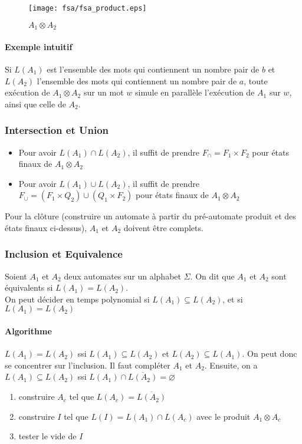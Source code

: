 \documentclass[a4paper]{article}
\begin{document}
  \begin{figure}[H]
    \begin{center}
      \texttt{[image: fsa/fsa\_product.eps]}
      \caption{$A_1 \otimes A_2$}
    \end{center}
  \end{figure}

  \paragraph{Exemple intuitif} Si $L(A_1)$ est l'ensemble des mots qui contiennent
  un nombre pair de $b$ et $L(A_2)$ l'ensemble des mots qui contiennent un 
  nombre pair de $a$, toute exécution de $A_1 \otimes A_2$ sur un mot $w$ simule
  en parallèle l'exécution de $A_1$ sur $w$, ainsi que celle de $A_2$.

  \subsubsection{Intersection et Union}
  \begin{itemize}
    \item Pour avoir $L(A_1) \cap L(A_2)$, il suffit de prendre $F_\cap = F_1 \times F_2$
    pour états finaux de $A_1 \otimes A_2$
    \item Pour avoir $L(A_1) \cup L(A_2)$, il suffit de prendre $F_\cup = (F_1 \times Q_2) \cup (Q_1 \times F_2)$
    pour états finaux de $A_1 \otimes A_2$
  \end{itemize}
  Pour la clôture (construire un automate à partir du pré-automate produit et des états
  finaux ci-dessus), $A_1$ et $A_2$ doivent être complets.

  \subsubsection{Inclusion et Equivalence}
  Soient $A_1$ et $A_2$ deux automates sur un alphabet $\Sigma$. On dit que
  $A_1$ et $A_2$ sont équivalents si $L(A_1) = L(A_2)$.\\
  On peut décider en temps polynomial si $L(A_1) \subseteq L(A_2)$, et si $L(A_1) = L(A_2)$

  \paragraph{Algorithme}
  $L(A_1) = L(A_2)$ ssi $L(A_1) \subseteq L(A_2)$ et $L(A_2) \subseteq L(A_1)$.
  On peut donc se concentrer sur l'inclusion. Il faut compléter $A_1$ et $A_2$.
  Ensuite, on a $L(A_1) \subseteq L(A_2)$ ssi $L(A_1) \cap \overline{L(A_2)} = \varnothing$
  \begin{enumerate}
    \item construire $A_c$ tel que $L(A_c) = \overline{L(A_2)}$
    \item construire $I$ tel que $L(I) = L(A_1) \cap L(A_c)$ avec le produit $A_1 \otimes A_c$
    \item tester le vide de $I$
  \end{enumerate}
\end{document}
